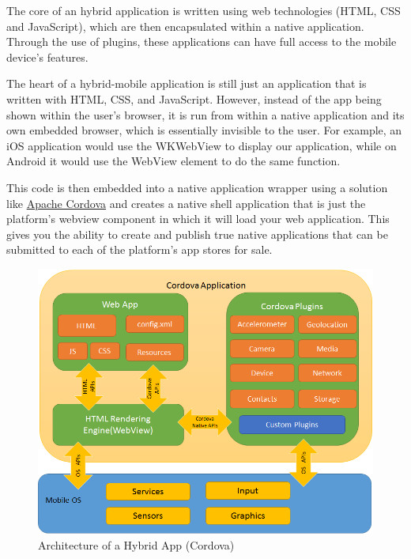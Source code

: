 The core of an hybrid application is written using web technologies (HTML, CSS and JavaScript), which are then encapsulated within a native application. Through the use of plugins, these applications can have full access to the mobile device’s features.\cite{ionic_hybid_app}\newline

The heart of a hybrid-mobile application is still just an application that is written with HTML, CSS, and JavaScript. However, instead of the app being shown within the user’s browser, it is run from within a native application and its own embedded browser, which is essentially invisible to the user. For example, an iOS application would use the WKWebView to display our application, while on Android it would use the WebView element to do the same function.\cite{ionic_hybid_app}\newline

This code is then embedded into a native application wrapper using a solution like \hyperlink{https://cordova.apache.org/docs/en/latest/guide/overview/}{Apache Cordova} and creates a native shell application that is just the platform’s webview component in which it will load your web application. This gives you the ability to create and publish true native applications that can be submitted to each of the platform’s app stores for sale.

\begin{figure}[h!]
	\caption{Architecture of a Hybrid App (Cordova) \cite{cordova_hybid_app}}
	\label{image:myImageName}
	\centering
	\includegraphics[width=1\textwidth]{Images/cordovaapparchitecture.png}
\end{figure}	

